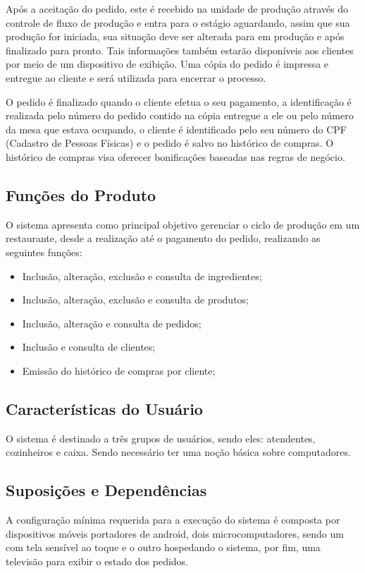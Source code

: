 \documentclass[article, 12pt, oneside, a4paper, brazil]{abntex2}
\begin{document}
 Após a aceitação do pedido, este é recebido na unidade de produção através do controle de fluxo de produção e entra para o estágio aguardando, assim que sua produção for iniciada, sua situação deve ser alterada para em produção e após finalizado para pronto. Tais informações também estarão disponíveis aos clientes por meio de um dispositivo de exibição. Uma cópia do pedido é impressa e entregue ao cliente e será utilizada para encerrar o processo.
 
 O pedido é finalizado quando o cliente efetua o seu pagamento, a identificação é realizada pelo número do pedido contido na cópia entregue a ele ou pelo número da mesa que estava ocupando, o cliente é identificado pelo seu número do CPF (Cadastro de Pessoas Físicas) e o pedido é salvo no histórico de compras. O histórico de compras visa oferecer bonificações baseadas nas regras de negócio.
 
 \subsection{Funções do Produto}
 O sistema apresenta como principal objetivo gerenciar o ciclo de produção em um restaurante, desde a realização até o pagamento do pedido, realizando as seguintes funções:
 
 \begin{itemize}
  \item Inclusão, alteração, exclusão e consulta de ingredientes;
  \item Inclusão, alteração, exclusão e consulta de produtos;
  \item Inclusão, alteração e consulta de pedidos;
  \item Inclusão e consulta de clientes;
  \item Emissão do histórico de compras por cliente;
 \end{itemize}

 \subsection{Características do Usuário}
 O sistema é destinado a três grupos de usuários, sendo eles: atendentes, cozinheiros e caixa. Sendo necessário ter uma noção básica sobre computadores.
 
 \subsection{Suposições e Dependências}
 A configuração mínima requerida para a execução do sistema é composta por dispositivos móveis portadores de android, dois microcomputadores, sendo um com tela sensível ao toque e o outro hospedando o sistema, por fim, uma televisão para exibir o estado dos pedidos.
 
\end{document}
